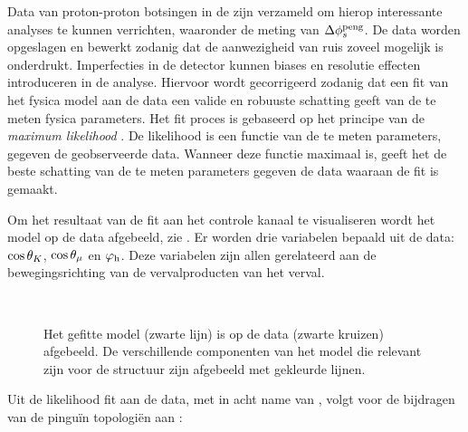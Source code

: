 Data van proton-proton botsingen in de \lhc zijn verzameld om hierop interessante analyses te kunnen verrichten, waaronder de meting van  $\Delta\phi_{s}^{\tiny\text{peng}}$. De data worden opgeslagen en bewerkt zodanig dat de aanwezigheid van ruis zoveel mogelijk is onderdrukt. Imperfecties in de detector kunnen biases en resolutie effecten introduceren in de analyse. Hiervoor wordt gecorrigeerd zodanig dat een fit van het fysica model aan de data een valide en robuuste schatting geeft van de te meten fysica parameters. Het fit proces is gebaseerd op het principe van de {\it maximum likelihood} \cite{cowan1998statistical}. De likelihood is een functie van de te meten parameters, gegeven de geobserveerde data. Wanneer deze functie maximaal is, geeft het de beste schatting van de te meten parameters gegeven de data waaraan de fit is gemaakt.

Om het resultaat van de fit aan het \BsJpsiKst controle kanaal te visualiseren wordt het model op de data
afgebeeld, zie . Er worden drie variabelen bepaald uit de data: $\cos\theta_{K}$,
$\cos\theta_{\mu}$ en $\varphi_{\rm h}$. Deze variabelen zijn allen gerelateerd aan de bewegingsrichting van de vervalproducten
van het \BsJpsiKst verval.

\begin{figure}[!t]
  \begin{subfigure}{0.5\textwidth}
    \centering
    \scalebox{1.2}{}
  \end{subfigure}%
  \hfill
  \begin{subfigure}{0.5\textwidth}
    \centering
    \scalebox{1.2}{}
  \end{subfigure}\\
  \begin{subfigure}{\textwidth}
    \centering
    \scalebox{1.2}{}
  \end{subfigure}
  \caption{Het gefitte model (zwarte lijn) is op de \BsJpsiKst data (zwarte kruizen) afgebeeld. De verschillende componenten van het model die relevant zijn voor de \CP structuur zijn afgebeeld met gekleurde lijnen.}
  \label{app_nl_angular_plot_thetas}
\end{figure}



Uit de likelihood fit aan de data, met in acht name van \cite{Fleischer:1999zi,Faller:2008gt,DeBruyn:2014oga,DeBruyn-thesis}, volgt voor de bijdragen van de pingu\"in topologi\"en aan \phis:

